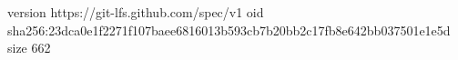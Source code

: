 version https://git-lfs.github.com/spec/v1
oid sha256:23dca0e1f2271f107baee6816013b593cb7b20bb2c17fb8e642bb037501e1e5d
size 662
